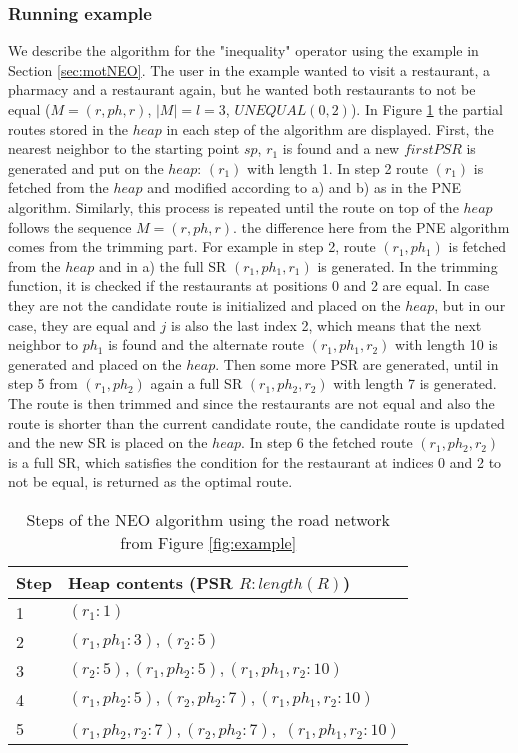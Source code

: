 \subsubsection{Running example}
We describe the algorithm for the "inequality" operator using the example in Section \ref{sec:motNEO}. The user in the example wanted to visit a restaurant, a pharmacy and a restaurant again, but he wanted both restaurants to not be equal ($M = (r, ph, r)$, $|M| = l = 3$, $UNEQUAL(0, 2)$). In Figure \ref{heapNEO} the partial routes stored in the $heap$ in each step of the algorithm are displayed. \newline
First, the nearest neighbor to the starting point $sp$, $r_1$  is found and a new $firstPSR$ is generated and put on the $heap$: $(r_1)$ with length 1. In step 2 route $(r_1)$ is fetched from the $heap$ and modified according to a) and b) as in the PNE algorithm. Similarly, this process is repeated until the route on top of the $heap$ follows the sequence $M = (r, ph, r)$. the difference here from the PNE algorithm comes from the trimming part. For example in step 2, route $(r_1, ph_1)$ is fetched from the $heap$ and in a) the full SR $(r_1, ph_1, r_1)$ is generated. In the trimming function, it is checked if the restaurants at positions 0 and 2 are equal. In case they are not the candidate route is initialized and placed on the $heap$, but in our case, they are equal and $j$ is also the last index 2, which means that the next neighbor to $ph_1$ is found and the alternate route $(r_1, ph_1, r_2)$ with length 10 is generated and placed on the $heap$. Then some more PSR are generated, until in step 5 from $(r_1, ph_2)$ again a full SR $(r_1, ph_2, r_2)$ with length 7 is generated. The route is then trimmed and since the restaurants are not equal and also the route is shorter than the current candidate route, the candidate route is updated and the new SR is placed on the $heap$. In step 6 the fetched route $(r_1, ph_2, r_2)$ is a full SR, which satisfies the condition for the restaurant at indices 0 and 2 to not be equal, is returned as the optimal route.

\begin{table}[h]
	\centering
	\begin{tabular}{ |l|l| } 
		\hline
		Step & Heap contents (PSR $R : length(R)$) \\
		\hline
		1 & $(r_1 : 1)$ \\ 
		 \hline
		2 & $(r_1, ph_1 : 3), (r_2 : 5)$ \\ 
		\hline
		3 & $(r_2 : 5), (r_1, ph_2 : 5), (r_1, ph_1, r_2 : 10)$ \\ 
		\hline
		4 & $(r_1, ph_2 : 5), (r_2, ph_2 : 7), (r_1, ph_1, r_2 : 10)$ \\ 
		\hline
		5 & $(r_1, ph_2, r_2 : 7), (r_2, ph_2 : 7),$ \st{$(r_1, ph_1, r_2 : 10)$} \\ 
		\hline
	\end{tabular}
	\caption{Steps of the NEO algorithm using the road network from Figure \ref{fig:example}}
	\label{heapNEO}
\end{table}

